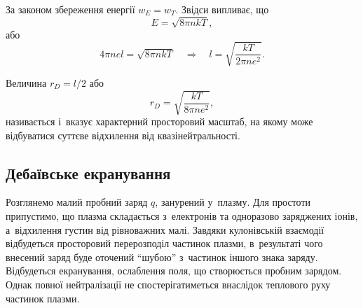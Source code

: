 За законом збереження енергії $w_E = w_T$. Звідси випливає, що
\begin{equation*}
	E = \sqrt{8\pi nkT},
\end{equation*}
або
\begin{equation*}
	4\pi nel = \sqrt{8\pi nkT} \quad\Rightarrow\quad l = \sqrt{\frac{kT}{2\pi ne^2}}.
\end{equation*}

Величина $r_D = l/2$ або
\begin{equation}\label{eq:debye-radius}
	r_D = \sqrt{\frac{kT}{8\pi ne^2}},
\end{equation}
називається  і~вказує характерний просторовий масштаб, на якому може відбуватися суттєве відхилення від квазінейтральності.

\subsection{Дебаївське екранування}

Розглянемо малий пробний заряд $q$, занурений у~плазму. Для простоти припустимо, що плазма складається з~електронів та одноразово заряджених іонів, а~відхилення густин від рівноважних малі. Завдяки кулонівській взаємодії відбудеться просторовий перерозподіл частинок плазми, в~результаті чого внесений заряд буде оточений \enquote{шубою} з~частинок іншого знака заряду. Відбудеться екранування, ослаблення поля, що створюється пробним зарядом. Однак повної нейтралізації не спостерігатиметься внаслідок теплового руху частинок плазми.

